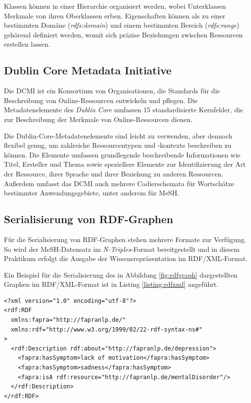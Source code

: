 Klassen können in einer Hierarchie organisiert werden, wobei Unterklassen Merkmale von ihren Oberklassen erben. Eigenschaften können als zu einer bestimmten Domäne (\emph{rdfs:domain}) und einem bestimmten Bereich (\emph{rdfs:range}) gehörend definiert werden, womit sich präzise Beziehungen zwischen Ressourcen erstellen lassen.



\subsection{Dublin Core Metadata Initiative}
Die \ac{DCMI}\cite{DCMI_dcmi_2022} ist ein Konsortium von Organisationen, die Standards für die Beschreibung von Online-Ressourcen entwickeln und pflegen. Die Metadatenelemente des \emph{Dublin Core} umfassen 15 standardisierte Kernfelder, die zur Beschreibung der Merkmale von Online-Ressourcen dienen.

Die Dublin-Core-Metadatenelemente sind leicht zu verwenden, aber dennoch flexibel genug, um zahlreiche Ressourcentypen und -kontexte beschreiben zu können. Die Elemente umfassen grundlegende beschreibende Informationen wie Titel, Ersteller und Thema sowie speziellere Elemente zur Identifizierung der Art der Ressource, ihrer Sprache und ihrer Beziehung zu anderen Ressourcen. Außerdem umfasst das \ac{DCMI} auch mehrere Codierschemata für Wortschätze bestimmter Anwendungsgebiete, unter anderem für \ac{MeSH}.



\subsection{Serialisierung von RDF-Graphen}

Für die Serialisierung von RDF-Graphen stehen mehrere Formate zur Verfügung. So wird der MeSH-Datensatz im \emph{N-Triples}-Format bereitgestellt und in diesem Praktikum erfolgt die Ausgabe der Wissensrepräsentation im RDF/XML-Format.

Ein Beispiel für die Serialisierung des in Abbildung \ref{fig:rdfgraph} dargestellten Graphen im RDF/XML-Format ist in Listing \ref{listing:rdfxml} angeführt.

\lstset{language=XML, caption=RDF/XML, label=listing:rdfxml}
\begin{lstlisting}
<?xml version="1.0" encoding="utf-8"?>
<rdf:RDF
  xmlns:fapra="http://fapranlp.de/"
  xmlns:rdf="http://www.w3.org/1999/02/22-rdf-syntax-ns#"
>
  <rdf:Description rdf:about="http://fapranlp.de/depression">
    <fapra:hasSymptom>lack of motivation</fapra:hasSymptom>
    <fapra:hasSymptom>sadness</fapra:hasSymptom>
    <fapra:isA rdf:resource="http://fapranlp.de/mentalDisorder"/>
  </rdf:Description>
</rdf:RDF>
\end{lstlisting}




